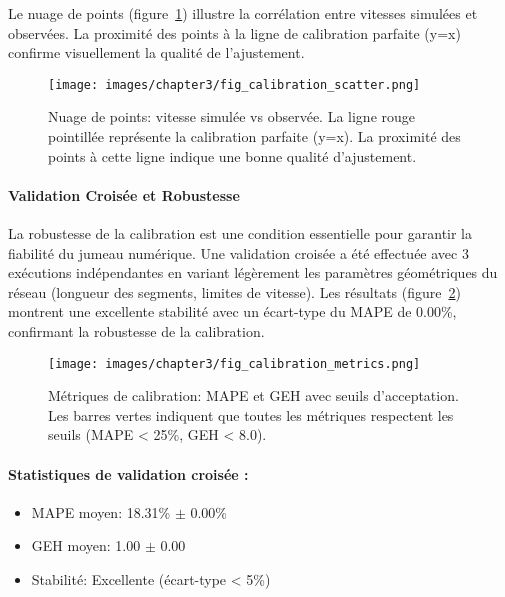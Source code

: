 Le nuage de points (figure~\ref{fig:calibration_scatter_74}) illustre la corrélation
entre vitesses simulées et observées. La proximité des points à la ligne de calibration
parfaite (y=x) confirme visuellement la qualité de l'ajustement.

\begin{figure}[htbp]
    \centering
    \texttt{[image: images/chapter3/fig\_calibration\_scatter.png]}
    \caption{Nuage de points: vitesse simulée vs observée. La ligne rouge pointillée représente
        la calibration parfaite (y=x). La proximité des points à cette ligne indique
        une bonne qualité d'ajustement.}
    \label{fig:calibration_scatter_74}
\end{figure}

\paragraph{Validation Croisée et Robustesse}

La robustesse de la calibration est une condition essentielle pour garantir la fiabilité du jumeau numérique. Une validation croisée a été effectuée
avec 3 exécutions indépendantes en variant légèrement les paramètres géométriques
du réseau (longueur des segments, limites de vitesse). Les résultats (figure~\ref{fig:calibration_metrics_74_robustness}) montrent une
excellente stabilité avec un écart-type du MAPE de 0.00\%, confirmant la robustesse
de la calibration.

\begin{figure}[htbp]
    \centering
    \texttt{[image: images/chapter3/fig\_calibration\_metrics.png]}
    \caption{Métriques de calibration: MAPE et GEH avec seuils d'acceptation. Les barres
        vertes indiquent que toutes les métriques respectent les seuils (MAPE < 25\%,
        GEH < 8.0).}
    \label{fig:calibration_metrics_74_robustness}
\end{figure}

\paragraph{Statistiques de validation croisée :}
\begin{itemize}
    \item MAPE moyen: 18.31\% $\pm$ 0.00\%
    \item GEH moyen: 1.00 $\pm$ 0.00
    \item Stabilité: Excellente (écart-type < 5\%)
\end{itemize}


